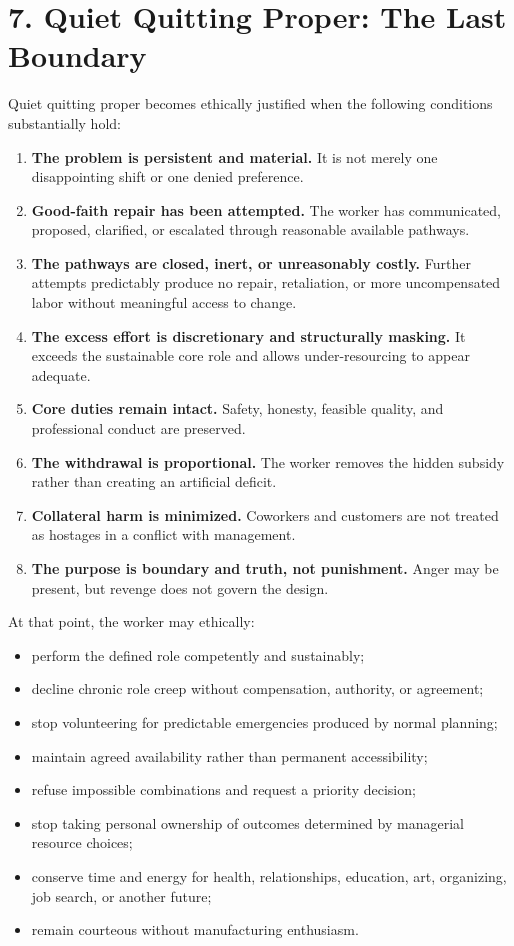 \documentclass[11pt,oneside]{article}
\providecommand{\tightlist}{%
  \setlength{\itemsep}{0.22em}\setlength{\parskip}{0pt}}
\begin{document}
\section{7. Quiet Quitting Proper: The Last Boundary}\label{quiet-quitting-proper-the-last-boundary}

Quiet quitting proper becomes ethically justified when the following conditions substantially hold:

\begin{enumerate}
\def\labelenumi{\arabic{enumi}.}
\tightlist
\item
  \textbf{The problem is persistent and material.} It is not merely one disappointing shift or one denied preference.
\item
  \textbf{Good-faith repair has been attempted.} The worker has communicated, proposed, clarified, or escalated through reasonable available pathways.
\item
  \textbf{The pathways are closed, inert, or unreasonably costly.} Further attempts predictably produce no repair, retaliation, or more uncompensated labor without meaningful access to change.
\item
  \textbf{The excess effort is discretionary and structurally masking.} It exceeds the sustainable core role and allows under-resourcing to appear adequate.
\item
  \textbf{Core duties remain intact.} Safety, honesty, feasible quality, and professional conduct are preserved.
\item
  \textbf{The withdrawal is proportional.} The worker removes the hidden subsidy rather than creating an artificial deficit.
\item
  \textbf{Collateral harm is minimized.} Coworkers and customers are not treated as hostages in a conflict with management.
\item
  \textbf{The purpose is boundary and truth, not punishment.} Anger may be present, but revenge does not govern the design.
\end{enumerate}

At that point, the worker may ethically:

\begin{itemize}
\tightlist
\item
  perform the defined role competently and sustainably;
\item
  decline chronic role creep without compensation, authority, or agreement;
\item
  stop volunteering for predictable emergencies produced by normal planning;
\item
  maintain agreed availability rather than permanent accessibility;
\item
  refuse impossible combinations and request a priority decision;
\item
  stop taking personal ownership of outcomes determined by managerial resource choices;
\item
  conserve time and energy for health, relationships, education, art, organizing, job search, or another future;
\item
  remain courteous without manufacturing enthusiasm.
\end{itemize}
\end{document}

